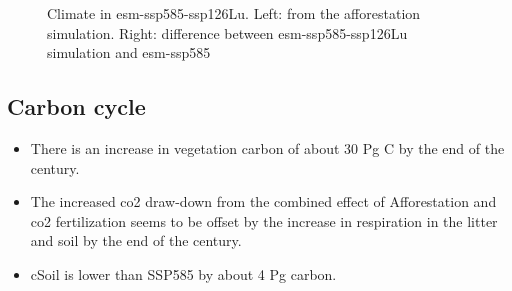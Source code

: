 \documentclass[]{article}
\begin{document}
\begin{figure}[!ht]
    \centering
    \begin{subfigure}[b]{0.45\linewidth}
        
    \end{subfigure}
    \begin{subfigure}[b]{0.45\linewidth}
        
    \end{subfigure}
    \begin{subfigure}[b]{0.45\linewidth}
        
    \end{subfigure}
    \begin{subfigure}[b]{0.45\linewidth}
        
    \end{subfigure}
    \caption{Climate in esm-ssp585-ssp126Lu. Left: from the afforestation simulation. Right: difference between esm-ssp585-ssp126Lu simulation and esm-ssp585}
    \label{fig:climate}
\end{figure}


\subsection{Carbon cycle}

\begin{itemize}
\item There is an increase in vegetation carbon of about 30 Pg C by the end of the century.

\item The increased co2 draw-down from the combined effect of Afforestation and co2 fertilization seems to be offset by the increase in respiration in the litter and soil by the end of the century.

\item cSoil is lower than SSP585 by about 4 Pg carbon.
\end{itemize}
\end{document}
